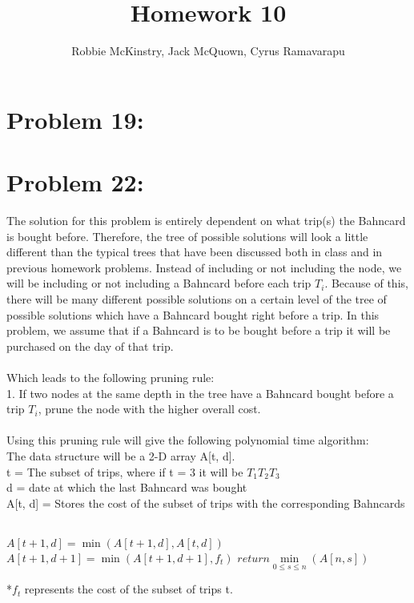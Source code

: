 \documentclass[12pt]{article}
\begin{document}
\title{Homework 10}
\author{Robbie McKinstry, Jack McQuown, Cyrus Ramavarapu}
\renewcommand{\today}{26 September 2016}
\renewcommand{\baselinestretch}{1.5}
\maketitle

\section*{Problem 19: }
\section*{Problem 22: }
The solution for this problem is entirely dependent on what trip(s) the Bahncard is bought before. Therefore, the tree of possible solutions will look a little different than the typical trees that have been discussed both in class and in previous homework problems. Instead of including or not including the node, we will be including or not including a Bahncard before each trip {$T_i$}. Because of this, there will be many different possible solutions on a certain level of the tree of possible solutions which have a Bahncard bought right before a trip. In this problem, we assume that if a Bahncard is to be bought before a trip it will be purchased on the day of that trip.\\\\
Which leads to the following pruning rule:\\
1. If two nodes at the same depth in the tree have a Bahncard bought before a trip {$T_i$}, prune the node with the higher overall cost.\\\\
Using this pruning rule will give the following polynomial time algorithm:\\
The data structure will be a 2-D array A[t, d].\\
t = The subset of trips, where if t = 3 it will be {$T_1T_2T_3$}\\
d = date at which the last Bahncard was bought\\
A[t, d] = Stores the cost of the subset of trips with the corresponding Bahncards\\
\begin{algorithm}[H]
\\
{
{
{$A[t+1,d] = \min(A[t+1,d], A[t,d])$\\
$A[t+1,d+1] = \min(A[t+1,d+1], f_t)$}
}
}
{$return \min\limits_{0 \leq s \leq n}(A[n, s])$}
\end{algorithm}
*{$f_t$} represents the cost of the subset of trips t.\\\\
\end{document}
